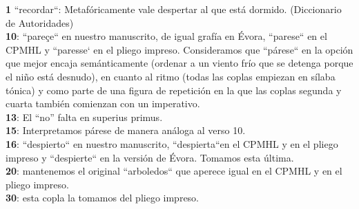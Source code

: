 \noindent \textbf{1} ``recordar``: Metafóricamente vale despertar al que está dormido. (Diccionario de Autoridades)\\
\textbf{10}: ``pareçe`` en nuestro manuscrito, de igual grafía en Évora, ``parese`` en el CPMHL y ``paresse` en el pliego impreso. Consideramos que ``párese`` en la opción que mejor encaja semánticamente (ordenar a un viento frío que se detenga porque el niño está desnudo), en cuanto al ritmo (todas las coplas empiezan en sílaba tónica) y como parte de una figura de repetición en la que las coplas segunda y cuarta también comienzan con un imperativo.\\
\textbf{13}: El ``no'' falta en superius primus.\\
\textbf{15}: Interpretamos párese de manera análoga al verso 10.\\
\textbf{16}: ``despierto`` en nuestro manuscrito, ``despierta``en el CPMHL y en el pliego impreso y ``despierte`` en la versión de Évora. Tomamos esta última.\\
\textbf{20}: mantenemos el original ``arboledos`` que aperece igual en el CPMHL y en el pliego impreso.\\
\textbf{30}: esta copla la tomamos del pliego impreso. 
